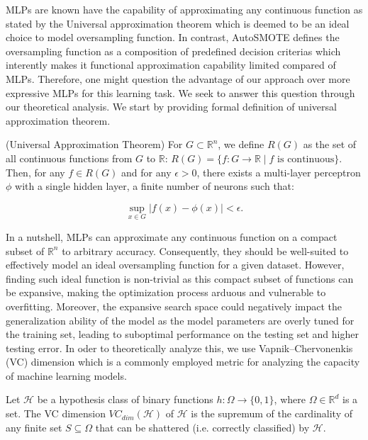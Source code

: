 MLPs are known have the capability of approximating any continuous function as stated by the Universal approximation theorem \cite{hornik1989multilayer,hornik1991approximation} which is deemed to be an ideal choice to model oversampling function. In contrast, AutoSMOTE defines the oversampling function as a composition of predefined decision criterias which interently makes it functional approximation capability limited compared of MLPs. Therefore, one might question the advantage of our approach over more expressive MLPs for this learning task. We seek to answer this question through our theoretical analysis. We start by providing formal definition of universal approximation theorem.

\begin{theorem} (Universal Approximation Theorem)
    For \( G \subset \mathbb{R}^n \),  we define \( R(G) \) as the set of all continuous functions from $G$ to $\mathbb{R}$: $R(G) = \{ f : G \to \mathbb{R} \mid f \text{ is continuous} \}$. Then, for any $f \in R(G)$  and for any \(\epsilon > 0\), there exists a multi-layer perceptron \( \phi \) with a single hidden layer, a finite number of neurons such that:

\[
\sup_{x \in G} | f(x) - \phi(x) | < \epsilon.
\]

\end{theorem}

In a nutshell, MLPs can approximate any continuous function on a compact subset of $\mathbb{R}^n$ to arbitrary accuracy. Consequently, they should be well-suited to effectively model an ideal oversampling function for a given dataset. However, finding such ideal function is non-trivial as this compact subset of functions can be expansive, making the optimization process arduous and vulnerable to overfitting. Moreover, the expansive search space could negatively impact the generalization ability of the model as the model parameters are overly tuned for the training set, leading to suboptimal performance on the testing set and higher testing error. In oder to theoretically analyze this, we use Vapnik–Chervonenkis (VC) dimension \cite{abu1989vapnik} which is a commonly employed metric for analyzing the capacity of machine learning models. 

\begin{definition}[VC Dimension]
Let $\mathcal{H}$ be a hypothesis class of binary functions $h: \Omega \to \{0, 1\}$, where $\Omega \in\mathbb{R}^d$ is a set. The VC dimension $VC_{dim}(\mathcal{H})$ of $\mathcal{H}$ is the supremum of the cardinality of any finite set $S \subseteq \Omega$ that can be shattered (i.e. correctly classified) by $\mathcal{H}$.
\end{definition}

